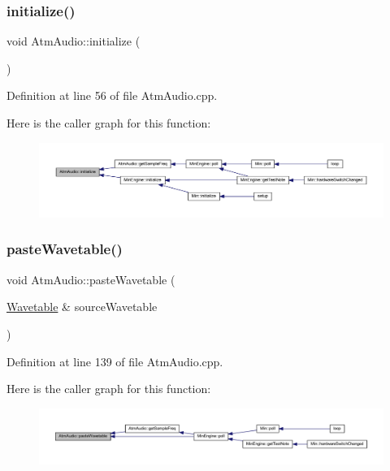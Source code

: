 \subsubsection{\texorpdfstring{initialize()}{initialize()}}
{\footnotesize\ttfamily void Atm\+Audio\+::initialize (\begin{DoxyParamCaption}{ }\end{DoxyParamCaption})\hspace{0.3cm}{\ttfamily [static]}}



Definition at line 56 of file Atm\+Audio.\+cpp.

Here is the caller graph for this function\+:
\nopagebreak
\begin{figure}[H]
\begin{center}
\leavevmode
\includegraphics[width=350pt]{class_atm_audio_ada27d4d2556b8b27f4c3c8b4da763176_icgraph}
\end{center}
\end{figure}
\mbox{\label{class_atm_audio_a3944db83a92a88144603c78b0260463a}} 
\subsubsection{\texorpdfstring{paste\+Wavetable()}{pasteWavetable()}}
{\footnotesize\ttfamily void Atm\+Audio\+::paste\+Wavetable (\begin{DoxyParamCaption}\item[{\hyperlink{class_wavetable}{Wavetable} \&}]{source\+Wavetable }\end{DoxyParamCaption})}



Definition at line 139 of file Atm\+Audio.\+cpp.

Here is the caller graph for this function\+:
\nopagebreak
\begin{figure}[H]
\begin{center}
\leavevmode
\includegraphics[width=350pt]{class_atm_audio_a3944db83a92a88144603c78b0260463a_icgraph}
\end{center}
\end{figure}
\mbox{\label{class_atm_audio_ab634d78d1e88550a4ed0ff1d93ed2d97}} 

